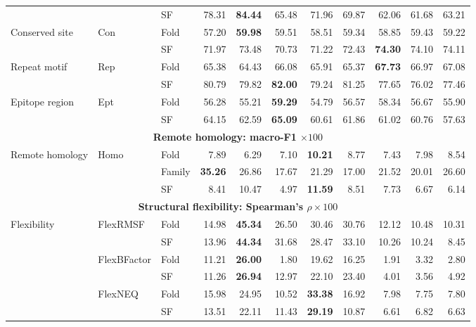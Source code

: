\begin{table}[p]
{\begin{tabular}{@{}lllrrrrrrrr@{}}
 &  & SF & 78.31 & \textbf{84.44} & 65.48 & 71.96 & 69.87 & 62.06 & 61.68 & 63.21 \\
\multirow{2}{*}{Conserved site} & \multirow{2}{*}{Con} & Fold & 57.20 & \textbf{59.98} & 59.51 & 58.51 & 59.34 & 58.85 & 59.43 & 59.22 \\
 &  & SF & 71.97 & 73.48 & 70.73 & 71.22 & 72.43 & \textbf{74.30} & 74.10 & 74.11 \\
\multirow{2}{*}{Repeat motif} & \multirow{2}{*}{Rep} & Fold & 65.38 & 64.43 & 66.08 & 65.91 & 65.37 & \textbf{67.73} & 66.97 & 67.08 \\
 &  & SF & 80.79 & 79.82 & \textbf{82.00} & 79.24 & 81.25 & 77.65 & 76.02 & 77.46 \\
\multirow{2}{*}{Epitope region} & \multirow{2}{*}{Ept} & Fold & 56.28 & 55.21 & \textbf{59.29} & 54.79 & 56.57 & 58.34 & 56.67 & 55.90 \\
 &  & SF & 64.15 & 62.59 & \textbf{65.09} & 60.61 & 61.86 & 61.02 & 60.76 & 57.63 \\
\midrule
\multicolumn{11}{c}{\textbf{Remote homology: macro-F1 $\times100$}} \\
\midrule
\multirow{3}{*}{Remote homology} & \multirow{3}{*}{Homo} & Fold & 7.89 & 6.29 & 7.10 & \textbf{10.21} & 8.77 & 7.43 & 7.98 & 8.54 \\
 &  & Family & \textbf{35.26} & 26.86 & 17.67 & 21.29 & 17.00 & 21.52 & 20.01 & 26.60 \\
 &  & SF & 8.41 & 10.47 & 4.97 & \textbf{11.59} & 8.51 & 7.73 & 6.67 & 6.14 \\
\midrule
\multicolumn{11}{c}{\textbf{Structural flexibility: Spearman's $\rho\times100$}} \\
\midrule
\multirow{6}{*}{Flexibility} & \multirow{2}{*}{FlexRMSF} & Fold & 14.98 & \textbf{45.34} & 26.50 & 30.46 & 30.76 & 12.12 & 10.48 & 10.31 \\
 &  & SF & 13.96 & \textbf{44.34} & 31.68 & 28.47 & 33.10 & 10.26 & 10.24 & 8.45 \\
 & \multirow{2}{*}{FlexBFactor} & Fold & 11.21 & \textbf{26.00} & 1.80 & 19.62 & 16.25 & 1.91 & 3.32 & 2.80 \\
 &  & SF & 11.26 & \textbf{26.94} & 12.97 & 22.10 & 23.40 & 4.01 & 3.56 & 4.92 \\
 & \multirow{2}{*}{FlexNEQ} & Fold & 15.98 & 24.95 & 10.52 & \textbf{33.38} & 16.92 & 7.98 & 7.75 & 7.80 \\
 &  & SF & 13.51 & 22.11 & 11.43 & \textbf{29.19} & 10.87 & 6.61 & 6.82 & 6.63 \\
\bottomrule
\end{tabular}%
}
\stbworkshopfit
\end{table}

